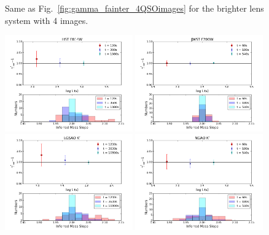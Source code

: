 \documentclass[a4paper,11pt]{article}
\begin{document}
\begin{figure}
\begin{center}
\end{center}
\caption{Same as Fig.~\ref{fig:gamma_fainter_4QSOimages} for the brighter lens system with 4 images.
\label{fig:gamma_brighter_4QSOimages}}
\end{figure}

\begin{figure}
\begin{center}
\includegraphics[width=0.49\textwidth]{figures/gamma_hist_0330_2QSO_HST.png}
\includegraphics[width=0.49\textwidth]{figures/gamma_hist_0330_2QSO_JWST.png} \\
\includegraphics[width=0.49\textwidth]{figures/gamma_hist_0330_2QSO_Keck.png}
\includegraphics[width=0.49\textwidth]{figures/gamma_hist_0330_2QSO_NGAO.png} \\

\end{center}
\end{figure}
\end{document}
